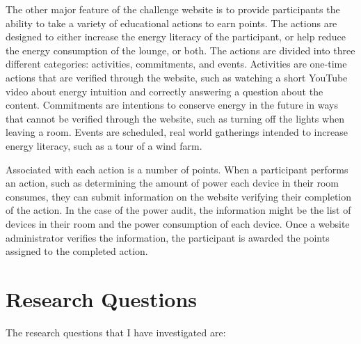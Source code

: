 The other major feature of the challenge website is to provide participants the ability to take a variety of educational actions to earn points. The actions are designed to either increase the energy literacy of the participant, or help reduce the energy consumption of the lounge, or both. The actions are divided into three different categories: activities, commitments, and events. Activities are one-time actions that are verified through the website, such as watching a short YouTube video about energy intuition and correctly answering a question about the content. Commitments are intentions to conserve energy in the future in ways that cannot be verified through the website, such as turning off the lights when leaving a room. Events are scheduled, real world gatherings intended to increase energy literacy, such as a tour of a wind farm.

Associated with each action is a number of points. When a participant performs an action, such as determining the amount of power each device in their room consumes, they can submit information on the website verifying their completion of the action. In the case of the power audit, the information might be the list of devices in their room and the power consumption of each device. Once a website administrator verifies the information, the participant is awarded the points assigned to the completed action.


\section{Research Questions}

The research questions that I have investigated are:

